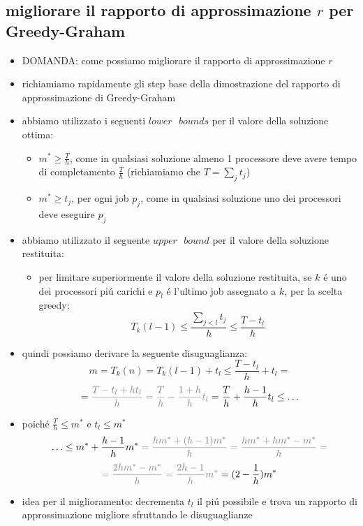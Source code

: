 \subsection*{migliorare il rapporto di approssimazione $r$ per Greedy-Graham}
\begin{flushleft}
	\begin{itemize}
		\item DOMANDA: come possiamo migliorare il rapporto di approssimazione $r$
		\item richiamiamo rapidamente gli step base della dimostrazione del rapporto di approssimazione di Greedy-Graham
		\item abbiamo utilizzato i seguenti $lower\text{ }bounds$ per il valore della soluzione ottima:
		\begin{itemize}
			\item $m^*\geq\frac{T}{h}$, come in qualsiasi soluzione almeno 1 processore deve avere tempo di completamento $\frac{T}{h}$ (richiamiamo che $T=\sum_j t_j$)
			\item $m^*\geq t_j$, per ogni job $p_j$, come in qualsiasi soluzione uno dei processori deve eseguire $p_j$
		\end{itemize}
		\item abbiamo utilizzato il seguente $upper\text{ }bound$ per il valore della soluzione restituita:
		\begin{itemize}
			\item per limitare superiormente il valore della soluzione restituita, se $k$ \'e uno dei processori pi\'u carichi e $p_l$ \'e l'ultimo job assegnato a $k$, per la scelta greedy:
				$$T_k(l-1)\leq\frac{\sum_{j<l}t_j}{h}\leq\frac{T-t_l}{h}$$
		\end{itemize}
		\item quindi possiamo derivare la seguente disuguaglianza:
			$$m=T_k(n)=T_k(l-1)+t_l\leq\frac{T-t_l}{h}+t_l=$$
			$$=\color{gray}\frac{T-t_l+ht_l}{h}=\frac{T}{h}-\frac{1+h}{h}t_l\color{black}=\frac{T}{h}+\frac{h-1}{h}t_l\leq\ldots$$
		\item poich\'e $\frac{T}{h}\leq m^*$ e $t_l\leq m^*$
			$$\ldots\leq m^*+\frac{h-1}{h}m^*\color{gray}=\frac{hm^*+(h-1)m^*}{h}=\frac{hm^*+hm^*-m^*}{h}=$$
			$$\color{gray}=\frac{2hm^*-m^*}{h}=\frac{2h-1}{h}m^*\color{black}=(2-\frac{1}{h})m^*$$
		\item idea per il miglioramento: decrementa $t_l$ il pi\'u possibile e trova un rapporto di approssimazione migliore sfruttando le disuguaglianze

\end{itemize}
\end{flushleft}
